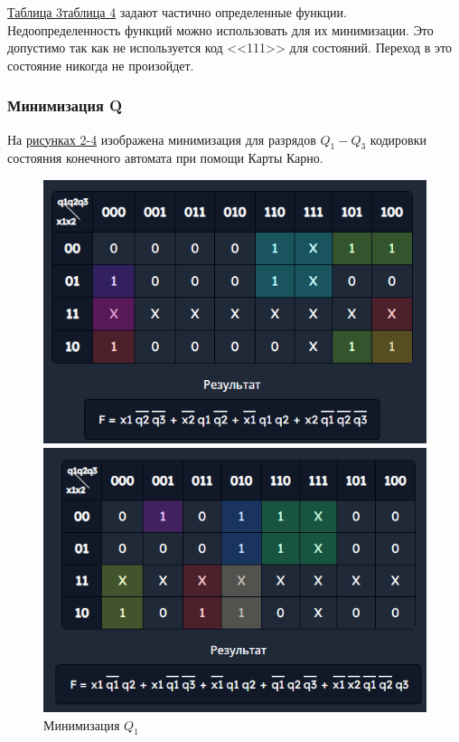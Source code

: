 \documentclass[10pt,a4paper,final]{article} %
\begin{document}
\hyperref[FL]{Таблица 3}\hyperref[F]{таблица 4} задают частично определенные функции. Недоопределенность функций можно использовать для их минимизации. Это допустимо так как не используется код <<111>> для состояний. Переход в это состояние никогда не произойдет.

\subsubsection{Минимизация Q}
На \hyperref[Q]{рисунках 2-4} изображена минимизация для разрядов $Q_1 - Q_3$ кодировки состояния конечного автомата при помощи Карты Карно.

\begin{figure}[htpb]
	\centering
	\begin{minipage}{0.3\textwidth}
		\includegraphics[scale=0.45]{img/Q1.png}
		\caption{Минимизация $Q_1$}
	\end{minipage}
	\hfill
	\begin{minipage}{0.3\textwidth}
		\includegraphics[scale=0.45]{img/Q2.png}

\end{minipage}
\end{figure}
\end{document}
